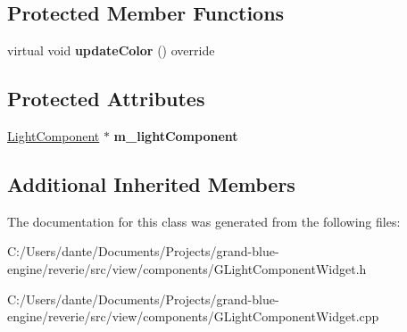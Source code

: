 \subsection*{Protected Member Functions}
\begin{DoxyCompactItemize}
\item 
\mbox{\label{classrev_1_1_view_1_1_light_ambient_color_widget_a108f3405bba0e5787f5bf6847418cedf}} 
virtual void {\bfseries update\+Color} () override
\end{DoxyCompactItemize}
\subsection*{Protected Attributes}
\begin{DoxyCompactItemize}
\item 
\mbox{\label{classrev_1_1_view_1_1_light_ambient_color_widget_a64aa177c058e87076d091f3da5f8b71d}} 
\mbox{\hyperlink{classrev_1_1_light_component}{Light\+Component}} $\ast$ {\bfseries m\+\_\+light\+Component}
\end{DoxyCompactItemize}
\subsection*{Additional Inherited Members}


The documentation for this class was generated from the following files\+:\begin{DoxyCompactItemize}
\item 
C\+:/\+Users/dante/\+Documents/\+Projects/grand-\/blue-\/engine/reverie/src/view/components/G\+Light\+Component\+Widget.\+h\item 
C\+:/\+Users/dante/\+Documents/\+Projects/grand-\/blue-\/engine/reverie/src/view/components/G\+Light\+Component\+Widget.\+cpp\end{DoxyCompactItemize}
